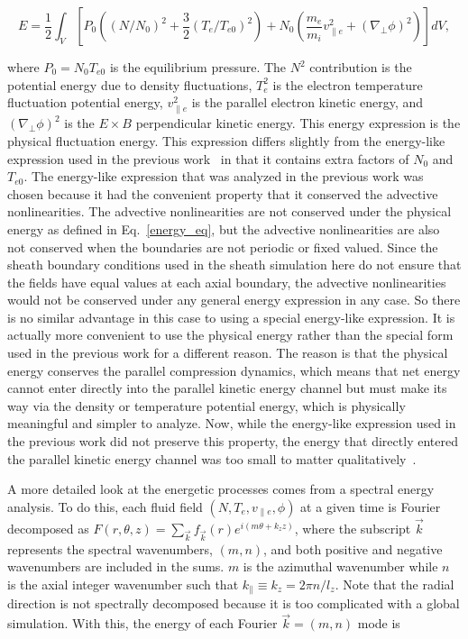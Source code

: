 \documentclass[showpacs,preprintnumbers,amsmath,amssymb,superscriptaddress,aip]{revtex4-1}
\def\beq{\begin{equation}}
\def\eeq{\end{equation}}
\def\para{\parallel}
\def\grad{\nabla}
\newcommand{\gradperp}{\grad_\perp}
\newcommand{\vpe}{v_{\parallel e}}
\begin{document}
\beq
\label{energy_eq}
E = \frac{1}{2} \int_V  \left[ P_0 \left((N/N_0)^2 + \frac{3}{2} (T_e/T_{e0})^2 \right) + N_0 \left( \frac{m_e}{m_i} \vpe^2 + (\gradperp \phi)^2 \right) \right] dV,
\eeq

where $P_0 = N_0 T_{e0}$ is the equilibrium pressure.
The $N^2$ contribution is the potential energy due to density fluctuations, $T_e^2$ is the electron temperature fluctuation potential energy,
$\vpe^2$ is the parallel electron kinetic energy, and $(\gradperp \phi)^2$ is the $E \times B$ perpendicular kinetic energy.
This energy expression is the physical fluctuation energy. This expression differs slightly from the energy-like expression used in the previous work~\cite{friedman2012b} in that it contains
extra factors of $N_0$ and $T_{e0}$. The energy-like expression that was analyzed in the previous work was chosen because it had the convenient property that it conserved the advective nonlinearities.
The advective nonlinearities are not conserved under the physical energy as defined in Eq.~\ref{energy_eq}, but the advective nonlinearities are also not conserved when the boundaries are not
periodic or fixed valued. Since the sheath boundary conditions used in the sheath simulation here do not ensure that the fields have equal values at each axial boundary, 
the advective nonlinearities would not be conserved under any general energy expression in any case.
So there is no similar advantage in this case to using a special energy-like expression. It is actually more convenient to use the physical energy rather than the special form used in the 
previous work for a different reason. 
The reason is that the physical energy conserves the parallel compression dynamics, which means that net energy cannot enter directly into
the parallel kinetic energy channel but must make its way via the density or temperature potential energy, which is physically meaningful and simpler to analyze. 
Now, while the energy-like expression used in the previous work did not preserve this property, the energy that directly entered the parallel kinetic energy channel was too small to matter 
qualitatively~\cite{friedman2012b}.

A more detailed look at the energetic processes comes from a spectral energy analysis. To do this, each fluid field $(N,T_e,\vpe,\phi)$ at a given time is Fourier decomposed as 
$F(r,\theta,z) = \sum_{\vec{k}} f_{\vec{k}}(r) e^{i (m \theta + k_z z )}$,
where the subscript $\vec{k}$ represents the spectral wavenumbers, $(m,n)$, and both positive and negative wavenumbers are included in the sums. 
$m$ is the azimuthal wavenumber while $n$ is the axial integer wavenumber such that $k_\para \equiv k_z = 2 \pi n/l_z$. 
Note that the radial direction is not spectrally decomposed because it is too complicated with a global simulation.
With this, the energy of each Fourier $\vec{k} = (m,n)$ mode is
\end{document}
